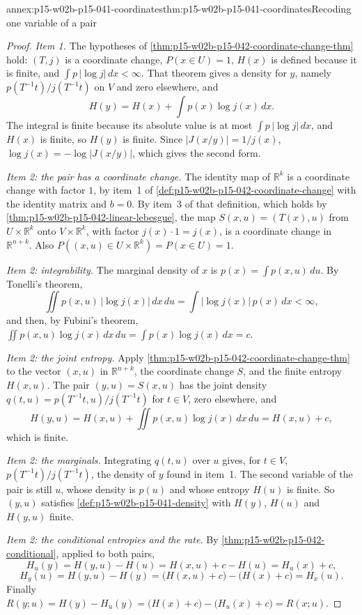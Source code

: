 \begin{annexitem}{annex:p15-w02b-p15-041-coordinates}{thm:p15-w02b-p15-041-coordinates}{Recoding one variable of a pair}
\begin{proof}
\emph{Item 1.} The hypotheses of
\cref{thm:p15-w02b-p15-042-coordinate-change-thm} hold: \((T,j)\) is a
coordinate change, \(P(x\in U)=1\), \(H(x)\) is defined because it is
finite, and \(\int p\,|\log j|\,dx<\infty\). That theorem gives a
density for \(y\), namely \(p(T^{-1}t)/j(T^{-1}t)\) on \(V\) and zero
elsewhere, and
\[
 H(y)=H(x)+\int p(x)\log j(x)\,dx .
\]
The integral is finite because its absolute value is at most
\(\int p\,|\log j|\,dx\), and \(H(x)\) is finite, so \(H(y)\) is
finite. Since \(|J(x/y)|=1/j(x)\), \(\log j(x)=-\log|J(x/y)|\), which
gives the second form.

\emph{Item 2: the pair has a coordinate change.} The identity map of
\(\mathbb R^k\) is a coordinate change with factor \(1\), by item~1 of
\cref{def:p15-w02b-p15-042-coordinate-change} with the identity matrix
and \(b=0\). By item~3 of that definition, which holds by
\cref{thm:p15-w02b-p15-042-linear-lebesgue}, the map
\(S(x,u)=(T(x),u)\) from \(U\times\mathbb R^k\) onto
\(V\times\mathbb R^k\), with factor \(j(x)\cdot1=j(x)\), is a
coordinate change in \(\mathbb R^{n+k}\). Also
\(P((x,u)\in U\times\mathbb R^k)=P(x\in U)=1\).

\emph{Item 2: integrability.} The marginal density of \(x\) is
\(p(x)=\int p(x,u)\,du\). By Tonelli's theorem,
\[
 \iint p(x,u)\,|\log j(x)|\,dx\,du=\int|\log j(x)|\,p(x)\,dx<\infty ,
\]
and then, by Fubini's theorem,
\(\iint p(x,u)\log j(x)\,dx\,du=\int p(x)\log j(x)\,dx=c\).

\emph{Item 2: the joint entropy.} Apply
\cref{thm:p15-w02b-p15-042-coordinate-change-thm} to the vector
\((x,u)\) in \(\mathbb R^{n+k}\), the coordinate change \(S\), and the
finite entropy \(H(x,u)\). The pair \((y,u)=S(x,u)\) has the joint
density \(q(t,u)=p(T^{-1}t,u)/j(T^{-1}t)\) for \(t\in V\), zero
elsewhere, and
\[
 H(y,u)=H(x,u)+\iint p(x,u)\log j(x)\,dx\,du=H(x,u)+c ,
\]
which is finite.

\emph{Item 2: the marginals.} Integrating \(q(t,u)\) over \(u\) gives,
for \(t\in V\), \(p(T^{-1}t)/j(T^{-1}t)\), the density of \(y\) found in
item~1. The second variable of the pair is still \(u\), whose density is
\(p(u)\) and whose entropy \(H(u)\) is finite. So \((y,u)\) satisfies
\cref{def:p15-w02b-p15-041-density} with \(H(y)\), \(H(u)\) and
\(H(y,u)\) finite.

\emph{Item 2: the conditional entropies and the rate.} By
\cref{thm:p15-w02b-p15-042-conditional}, applied to both pairs,
\[
 H_u(y)=H(y,u)-H(u)=H(x,u)+c-H(u)=H_u(x)+c,
\]
\[
 H_y(u)=H(y,u)-H(y)=\bigl(H(x,u)+c\bigr)-\bigl(H(x)+c\bigr)=H_x(u).
\]
Finally
\(R(y;u)=H(y)-H_u(y)=\bigl(H(x)+c\bigr)-\bigl(H_u(x)+c\bigr)=R(x;u)\).
\end{proof}
\end{annexitem}
